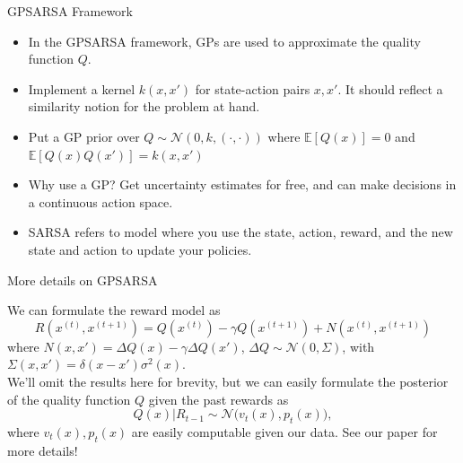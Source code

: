 \documentclass{beamer}
\begin{document}
\begin{frame}{GPSARSA Framework}
\begin{itemize}
\item In the GPSARSA framework, GPs are used to approximate the quality function $Q$.

\item Implement a kernel $k(x,x')$ for state-action pairs $x, x'$. It should reflect a similarity notion for the problem at hand.

\item Put a GP prior over $Q\sim \mathcal{N}(0, k,(\cdot, \cdot))$ where $\mathbb{E}[Q(x)] = 0$ and $\mathbb{E}[Q(x)Q(x')] = k(x, x')$

\item Why use a GP? Get uncertainty estimates for free, and can make decisions in a continuous action space.
\item SARSA refers to model where you use the state, action, reward, and the new state and action to update your policies.
\end{itemize}
\end{frame}

\begin{frame}{More details on GPSARSA}

We can formulate the reward model as
\begin{equation*}
R(x^{(t)}, x^{(t+1)}) = Q(x^{(t)}) - \gamma Q(x^{(t+1)}) + N(x^{(t)}, x^{(t+1)})
\end{equation*}
where $N(x, x') = \Delta Q(x) - \gamma \Delta Q(x')$, $\Delta Q \sim \mathcal{N}(0,\Sigma)$,
with $\Sigma(x, x') = \delta(x - x')\sigma^2(x)$.
\[ \]
We'll omit the results here for brevity, but we can easily formulate the posterior of the quality function $Q$ given the past rewards as
\begin{equation}
Q(x)|R_{t-1} \sim \mathcal{N}\big(v_t(x), p_t(x)\big),
\end{equation}
where $v_t(x), p_t(x)$ are easily computable given our data. See our paper for more details!
\end{frame}
\end{document}

